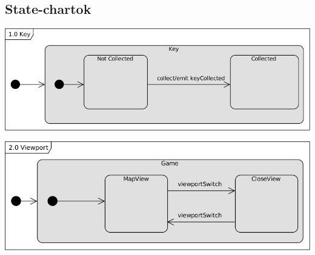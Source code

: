 	\subsection{State-chartok}
\begin{center}\includegraphics[scale=1]{resources/10Key.png}\end{center}	
\begin{center}\includegraphics[scale=1]{resources/20Viewport.png}\end{center}

	
